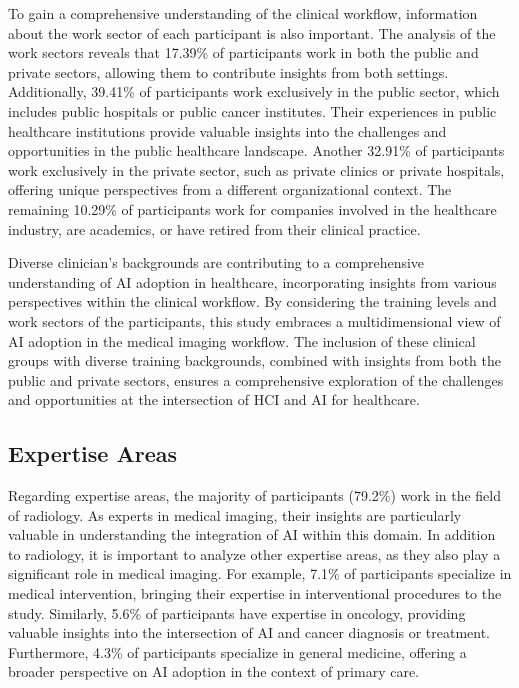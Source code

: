 To gain a comprehensive understanding of the clinical workflow, information about the work sector of each participant is also important.
The analysis of the work sectors reveals that 17.39\% of participants work in both the public and private sectors, allowing them to contribute insights from both settings.
Additionally, 39.41\% of participants work exclusively in the public sector, which includes public hospitals or public cancer institutes.
Their experiences in public healthcare institutions provide valuable insights into the challenges and opportunities in the public healthcare landscape.
Another 32.91\% of participants work exclusively in the private sector, such as private clinics or private hospitals, offering unique perspectives from a different organizational context.
The remaining 10.29\% of participants work for companies involved in the healthcare industry, are academics, or have retired from their clinical practice.

Diverse clinician's backgrounds are contributing to a comprehensive understanding of \ac{AI} adoption in healthcare, incorporating insights from various perspectives within the clinical workflow.
By considering the training levels and work sectors of the participants, this study embraces a multidimensional view of \ac{AI} adoption in the medical imaging workflow.
The inclusion of these clinical groups with diverse training backgrounds, combined with insights from both the public and private sectors, ensures a comprehensive exploration of the challenges and opportunities at the intersection of \ac{HCI} and \ac{AI} for healthcare.

\subsection{Expertise Areas}
\label{chap:app003003003}

Regarding expertise areas, the majority of participants (79.2\%) work in the field of radiology.
As experts in medical imaging, their insights are particularly valuable in understanding the integration of \ac{AI} within this domain.
In addition to radiology, it is important to analyze other expertise areas, as they also play a significant role in medical imaging.
For example, 7.1\% of participants specialize in medical intervention, bringing their expertise in interventional procedures to the study.
Similarly, 5.6\% of participants have expertise in oncology, providing valuable insights into the intersection of \ac{AI} and cancer diagnosis or treatment.
Furthermore, 4.3\% of participants specialize in general medicine, offering a broader perspective on \ac{AI} adoption in the context of primary care.

